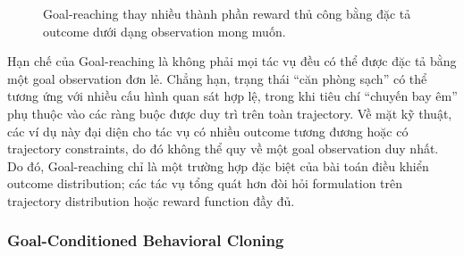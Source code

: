 \begin{figure}[H]
    \centering
    \caption{Goal-reaching thay nhiều thành phần reward thủ công bằng đặc tả outcome dưới dạng observation mong muốn.}
    \label{fig:tv2-goal-reaching-tikz}
\end{figure}

Hạn chế của Goal-reaching là không phải mọi tác vụ đều có thể được đặc tả bằng một goal observation đơn lẻ.
Chẳng hạn, trạng thái ``căn phòng sạch'' có thể tương ứng với nhiều cấu hình quan sát hợp lệ, trong khi tiêu chí ``chuyến bay êm'' phụ thuộc vào các ràng buộc được duy trì trên toàn trajectory.
Về mặt kỹ thuật, các ví dụ này đại diện cho tác vụ có nhiều outcome tương đương hoặc có trajectory constraints, do đó không thể quy về một goal observation duy nhất.
Do đó, Goal-reaching chỉ là một trường hợp đặc biệt của bài toán điều khiển outcome distribution; các tác vụ tổng quát hơn đòi hỏi formulation trên trajectory distribution hoặc reward function đầy đủ.

\subsubsection{Goal-Conditioned Behavioral Cloning}

